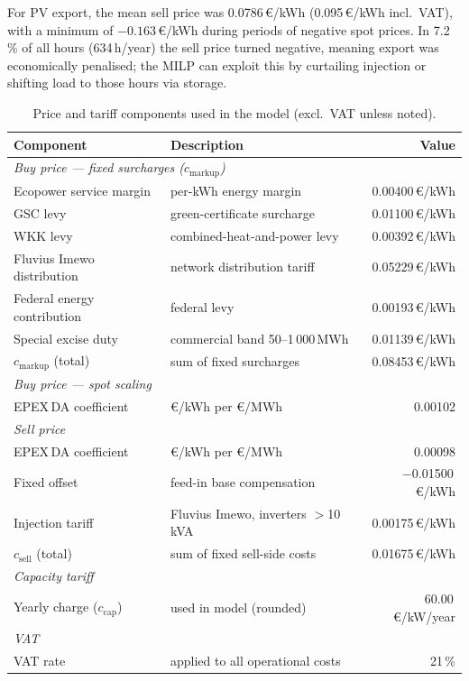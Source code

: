 \documentclass[11pt,a4paper]{report}
\begin{document}
For PV export, the mean sell price was 0.0786\,\euro/kWh (0.095\,\euro/kWh incl.\ VAT),
with a minimum of $-0.163$\,\euro/kWh during periods of negative spot prices.
In 7.2\,\% of all hours (634\,h/year) the sell price turned negative, meaning export
was economically penalised; the MILP can exploit this by curtailing injection or
shifting load to those hours via storage.

\begin{table}[H]
\centering
\caption{Price and tariff components used in the model (excl.\ VAT unless noted).}
\label{tab:price_components}
\begin{tabular}{llr}
\toprule
\textbf{Component} & \textbf{Description} & \textbf{Value} \\
\midrule
\multicolumn{3}{l}{\textit{Buy price --- fixed surcharges ($c_\mathrm{markup}$)}} \\
Ecopower service margin    & per-kWh energy margin          & 0.00400\,\euro/kWh \\
GSC levy                   & green-certificate surcharge    & 0.01100\,\euro/kWh \\
WKK levy                   & combined-heat-and-power levy   & 0.00392\,\euro/kWh \\
Fluvius Imewo distribution & network distribution tariff    & 0.05229\,\euro/kWh \\
Federal energy contribution & federal levy                  & 0.00193\,\euro/kWh \\
Special excise duty        & commercial band 50--1\,000\,MWh & 0.01139\,\euro/kWh \\
\midrule
$c_\mathrm{markup}$ (total) & sum of fixed surcharges       & 0.08453\,\euro/kWh \\
\midrule
\multicolumn{3}{l}{\textit{Buy price --- spot scaling}} \\
EPEX\,DA coefficient       & \euro/kWh per \euro/MWh        & 0.00102 \\
\midrule
\multicolumn{3}{l}{\textit{Sell price}} \\
EPEX\,DA coefficient       & \euro/kWh per \euro/MWh        & 0.00098 \\
Fixed offset               & feed-in base compensation      & $-$0.01500\,\euro/kWh \\
Injection tariff           & Fluvius Imewo, inverters $>$10\,kVA & 0.00175\,\euro/kWh \\
\midrule
$c_\mathrm{sell}$ (total)  & sum of fixed sell-side costs   & 0.01675\,\euro/kWh \\
\midrule
\multicolumn{3}{l}{\textit{Capacity tariff}} \\
Yearly charge ($c_\mathrm{cap}$) & used in model (rounded)   & 60.00\,\euro/kW/year \\
\midrule
\multicolumn{3}{l}{\textit{VAT}} \\
VAT rate                   & applied to all operational costs & 21\,\% \\
\bottomrule
\end{tabular}
\end{table}
\end{document}
